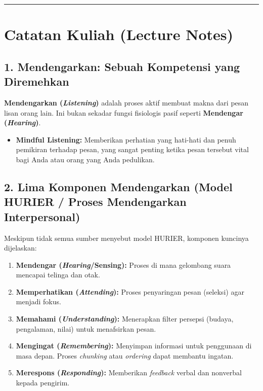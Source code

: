 \documentclass[
  letterpaper,
  DIV=11,
  numbers=noendperiod]{scrreprt}
\providecommand{\tightlist}{%
  \setlength{\itemsep}{0pt}\setlength{\parskip}{0pt}}
\begin{document}
\begin{center}\rule{0.5\linewidth}{0.5pt}\end{center}

\section{Catatan Kuliah (Lecture
Notes)}\label{catatan-kuliah-lecture-notes}

\subsection{1. Mendengarkan: Sebuah Kompetensi yang
Diremehkan}\label{mendengarkan-sebuah-kompetensi-yang-diremehkan}

\textbf{Mendengarkan (\emph{Listening})} adalah proses aktif membuat
makna dari pesan lisan orang lain. Ini bukan sekadar fungsi fisiologis
pasif seperti \textbf{Mendengar (\emph{Hearing})}.

\begin{itemize}
\tightlist
\item
  \textbf{Mindful Listening:} Memberikan perhatian yang hati-hati dan
  penuh pemikiran terhadap pesan, yang sangat penting ketika pesan
  tersebut vital bagi Anda atau orang yang Anda pedulikan.
\end{itemize}

\subsection{2. Lima Komponen Mendengarkan (Model HURIER / Proses
Mendengarkan
Interpersonal)}\label{lima-komponen-mendengarkan-model-hurier-proses-mendengarkan-interpersonal}

Meskipun tidak semua sumber menyebut model HURIER, komponen kuncinya
dijelaskan:

\begin{enumerate}
\def\labelenumi{\arabic{enumi}.}
\tightlist
\item
  \textbf{Mendengar (\emph{Hearing}/Sensing):} Proses di mana gelombang
  suara mencapai telinga dan otak.
\item
  \textbf{Memperhatikan (\emph{Attending}):} Proses penyaringan pesan
  (seleksi) agar menjadi fokus.
\item
  \textbf{Memahami (\emph{Understanding}):} Menerapkan filter persepsi
  (budaya, pengalaman, nilai) untuk menafsirkan pesan.
\item
  \textbf{Mengingat (\emph{Remembering}):} Menyimpan informasi untuk
  penggunaan di masa depan. Proses \emph{chunking} atau \emph{ordering}
  dapat membantu ingatan.
\item
  \textbf{Merespons (\emph{Responding}):} Memberikan \emph{feedback}
  verbal dan nonverbal kepada pengirim.
\end{enumerate}
\end{document}
